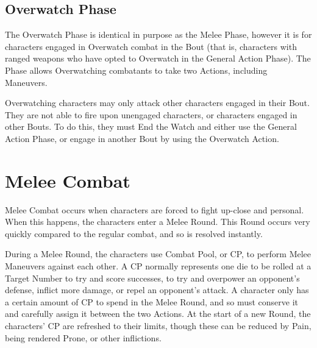 \documentclass[oneside,11pt,english]{book}
\begin{document}
\subsection{Overwatch Phase}
The Overwatch Phase is identical in purpose as the Melee Phase, however it is for characters engaged in
Overwatch combat in the Bout (that is, characters with ranged weapons who have opted to Overwatch in
the General Action Phase). The Phase allows Overwatching combatants to take two Actions, including
Maneuvers.

Overwatching characters may only attack other characters engaged in their Bout. They are not able to fire
upon unengaged characters, or characters engaged in other Bouts. To do this, they must End the Watch
and either use the General Action Phase, or engage in another Bout by using the Overwatch Action.

\section{Melee Combat}\label{sec:melee-combat}
Melee Combat occurs when characters are forced to fight up-close and personal. When this happens, the characters enter a Melee Round. This Round occurs very quickly compared to the regular combat, and so is resolved instantly.

During a Melee Round, the characters use Combat Pool, or CP, to perform Melee Maneuvers against each other. A CP normally represents one die to be rolled at a Target Number to try and score successes, to try and overpower an opponent’s defense, inflict more damage, or repel an opponent’s attack. A character only has a certain amount of CP to spend in the Melee Round, and so must conserve it and carefully assign it between the two Actions. At the start of a new Round, the characters’ CP are refreshed to their limits, though these can be reduced by Pain, being rendered Prone, or other inflictions.
\end{document}
